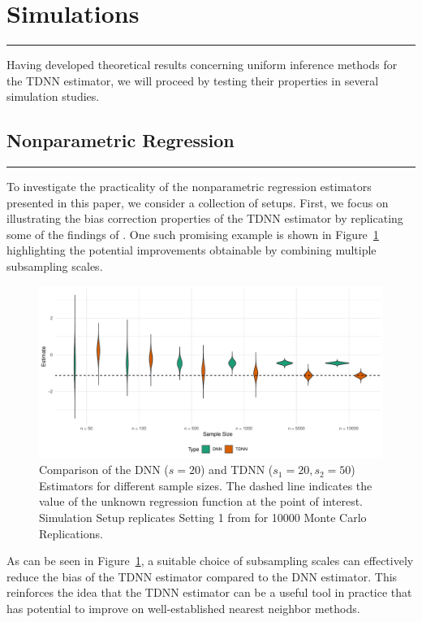 \section{Simulations}\label{sec:simulations}
\hrule

Having developed theoretical results concerning uniform inference methods for the TDNN estimator, we will proceed by testing their properties in several simulation studies.

\subsection{Nonparametric Regression}
\hrule
To investigate the practicality of the nonparametric regression estimators presented in this paper, we consider a collection of setups.
First, we focus on illustrating the bias correction properties of the TDNN estimator by replicating some of the findings of \citet{demirkaya_optimal_2024}.
One such promising example is shown in Figure~\ref{fig:TDNN_bias_cor} highlighting the potential improvements obtainable by combining multiple subsampling scales.
\begin{figure}[H]
	\centering
	\includegraphics[width = \textwidth]{../Code/Simulations/Graphics/TDNN_DNN.pdf}
	\caption{Comparison of the DNN ($s = 20$) and TDNN ($s_1 = 20, s_2 = 50$) Estimators for different sample sizes.
		The dashed line indicates the value of the unknown regression function at the point of interest.
		Simulation Setup replicates Setting 1 from \citet{demirkaya_optimal_2024} for 10000 Monte Carlo Replications.}
	\label{fig:TDNN_bias_cor}
\end{figure}
As can be seen in Figure~\ref{fig:TDNN_bias_cor}, a suitable choice of subsampling scales can effectively reduce the bias of the TDNN estimator compared to the DNN estimator.
This reinforces the idea that the TDNN estimator can be a useful tool in practice that has potential to improve on well-established nearest neighbor methods.

